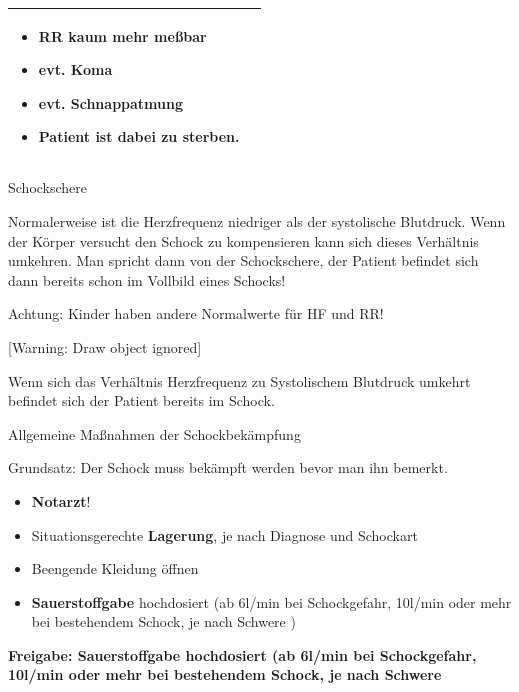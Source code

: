 \documentclass{article}
\newcommand\gEs[1]{\textbf{\textcolor[rgb]{0.0,0.0,0.5019608}{#1}}}
\newcommand\gEs[1]{\textbf{\textcolor[rgb]{0.0,0.0,0.5019608}{#1}}}
\begin{document}
\begin{center}
\begin{tabular}{|m{3.9750001cm}m{9.325cm}|}
\begin{itemize}
\item {\mdseries RR kaum mehr me{\ss}bar}

\item {\mdseries evt. Koma}

\item {\mdseries evt. Schnappatmung}

\item {\mdseries Patient ist dabei zu sterben.}

\end{itemize}
\\\hline
\end{tabular}
\end{center}
{\mdseries\color{black}
Schockschere}

{\mdseries
Normalerweise ist die Herzfrequenz niedriger als der systolische
Blutdruck. Wenn der K\"orper versucht den Schock zu kompensieren kann
sich dieses Verh\"altnis umkehren. Man spricht dann von der
Schockschere, der Patient befindet sich dann bereits schon im Vollbild
eines Schocks! }

{\mdseries
Achtung: Kinder haben andere Normalwerte f\"ur HF und RR!}

[Warning: Draw object ignored]

{\mdseries
Wenn sich das Verh\"altnis Herzfrequenz zu Systolischem Blutdruck
umkehrt befindet sich der Patient bereits im Schock. }

{\mdseries\color[rgb]{0.0,0.0,0.5019608}
\label{bkm:RefHeading38104902}Allgemeine Ma{\ss}nahmen der
Schockbek\"ampfung}

{\mdseries
Grundsatz: Der Schock muss bek\"ampft werden bevor man ihn bemerkt.}

\begin{itemize}
\item {\color[rgb]{0.0,0.0,0.5019608}
\gEs{Notarzt}!}

\item {\mdseries\color[rgb]{0.0,0.0,0.5019608}
Situationsgerechte  \gEs{Lagerung}, je nach Diagnose
und Schockart}

\item {\mdseries\color[rgb]{0.0,0.0,0.5019608}
Beengende Kleidung \"offnen}

\item {\mdseries\color[rgb]{0.0,0.0,0.5019608}
\gEs{Sauerstoffgabe} hochdosiert (ab 6l/min bei
Schockgefahr, 10l/min oder mehr bei bestehendem Schock, je nach
Schwere%
%
)}

\end{itemize}
{\bfseries\color[rgb]{0.5019608,0.0,0.0}
Freigabe: Sauerstoffgabe hochdosiert (ab 6l/min bei Schockgefahr,
10l/min oder mehr bei bestehendem Schock, je nach Schwere}
\end{document}
